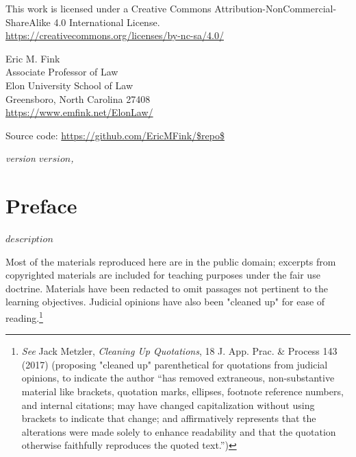 \begin{small}
\raggedright{This work is licensed under a Creative Commons Attribution-NonCommercial-ShareAlike 4.0 International License.} \\
\url{https://creativecommons.org/licenses/by-nc-sa/4.0/}

\vspace{1em}

Eric M. Fink\\
Associate Professor of Law \\
Elon University School of Law \\
Greensboro, North Carolina 27408 \\
\url{https://www.emfink.net/ElonLaw/}

\vspace{1em}

Source code: \url{https://github.com/EricMFink/$repo$}

\itshape{version $version$, \monthyear}

\end{small}
\endgroup

\clearpage


\thispagestyle{empty}

\vspace*{\fill}
\vspace*{\fill}

\chapter*{Preface}

{$description$}

Most of the materials reproduced here are in the public domain; excerpts from copyrighted materials are included for teaching purposes under the fair use doctrine. Materials have been redacted to omit passages not pertinent to the learning objectives. Judicial opinions have also been "cleaned up" for ease of reading.\footnote{\textit{See} Jack Metzler, {\textit{Cleaning Up Quotations}}, 18 J. App. Prac. \& Process 143 (2017) (proposing "cleaned up" parenthetical for quotations from judicial opinions, to indicate the author “has removed extraneous, non-substantive material like brackets, quotation marks, ellipses, footnote reference numbers, and internal citations; may have changed capitalization without using brackets to indicate that change; and affirmatively represents that the alterations were made solely to enhance readability and that the quotation otherwise faithfully reproduces the quoted text.”)} 